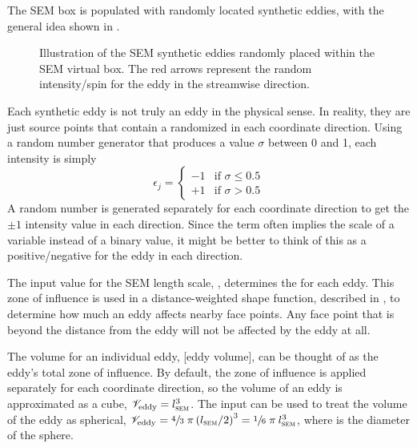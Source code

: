 
\label{SEC:SEM:theory:AddEddies}

The SEM box is populated with randomly located synthetic eddies, with the
general idea shown in .
%
\begin{figure}[tb]
  \caption[Illustration of the SEM synthetic eddies.]%
  {Illustration of the SEM synthetic eddies randomly placed within the
  SEM virtual box. The red arrows represent the random intensity\slash spin
  for the eddy in the streamwise direction.}
  \label{FIG:SEM:InflowBoxEddies}
\end{figure}
%
Each synthetic eddy is not truly an eddy in the physical sense.
%
In reality, they are just source points that contain a randomized
 in each coordinate direction.
%
Using a random number generator that produces a value $\sigma$ between 0 and 1,
each intensity is simply
%
\begin{equation*}
  \epsilon_j = 
  \begin{cases}
    -1 & \textrm{if } \sigma\leq 0.5\\
    +1 & \textrm{if } \sigma > 0.5
  \end{cases}
\end{equation*}
%
A random number is generated separately for each coordinate direction to get the
$\pm 1$ intensity value in each direction.
%
Since the term  often implies the scale of a variable
instead of a binary value, it might be better to think of this as a
positive\slash negative  for the eddy in each direction.


The input value for the SEM length scale, \lSEM, determines the
 for each eddy.
%
This zone of influence is used in a distance-weighted shape function, described
in , to determine how much an eddy affects
nearby face points.
%
Any face point that is beyond the distance \lSEM{} from the eddy will not be
affected by the eddy at all.


The volume for an individual eddy,
[eddy volume],
can be thought of as the eddy's total zone of influence.
%
By default, the zone of influence is applied separately for each coordinate
direction, so the volume of an eddy is approximated as a cube, $\mathscr{V}_{\mathrm{eddy}}=l_{\textsc{sem}}^3$.
%
The input
can be used to treat the volume of the eddy as spherical,
$\mathscr{V}_{\mathrm{eddy}} = \sfrac{4}{3} \; \pi \left( l_{\textsc{sem}} / 2 \right)^3
        = \sfrac{1}{6} \; \pi \: l_{\textsc{sem}}^3$,
where \lSEM{} is the diameter of the sphere.

